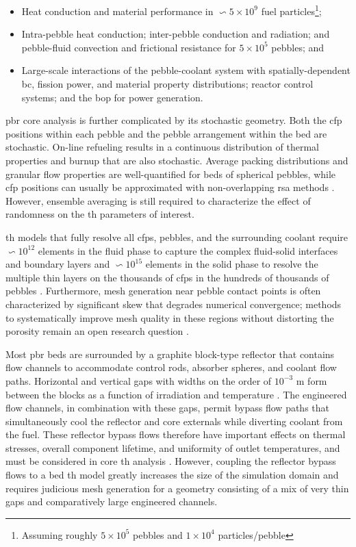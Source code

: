 \begin{itemize}
\item Heat conduction and material performance in \(\backsim5\times10^9\) fuel particles\hspace{0.01cm}\footnote{Assuming roughly \(5\times10^5\) pebbles and \(1\times10^4\) particles/pebble}; 
\item Intra-pebble heat conduction; inter-pebble conduction and radiation; and pebble-fluid convection and frictional resistance for \(5\times10^5\) pebbles; and
\item Large-scale interactions of the pebble-coolant system with spatially-dependent \gls{bc}, fission power, and material property distributions; reactor control systems; and the \gls{bop} for power generation.
\end{itemize}

\gls{pbr} core analysis is further complicated by its stochastic geometry. Both the \gls{cfp} positions within each pebble and the pebble arrangement within the bed are stochastic. On-line refueling results in a continuous distribution of thermal properties and burnup that are also stochastic. Average packing distributions and granular flow properties are well-quantified for beds of spherical pebbles, while \gls{cfp} positions can usually be approximated with non-overlapping \gls{rsa} methods \cite{jodrey}. However, ensemble averaging is still required to characterize the effect of randomness on the \gls{th} parameters of interest.

\gls{th} models that fully resolve all \glspl{cfp}, pebbles, and the surrounding coolant require \(\backsim10^{12}\) elements in the fluid phase to capture the complex fluid-solid interfaces and boundary layers \cite{wu2010} and \(\backsim10^{15}\) elements in the solid phase to resolve the multiple thin layers on the thousands of \glspl{cfp} in the hundreds of thousands of pebbles \cite{novak_2019}. Furthermore, mesh generation near pebble contact points is often characterized by significant skew that degrades numerical convergence; methods to systematically improve mesh quality in these regions without distorting the porosity remain an open research question \cite{dixon,nijemeisland}.

Most \gls{pbr} beds are surrounded by a graphite block-type reflector that contains flow channels to accommodate control rods, absorber spheres, and coolant flow paths. Horizontal and vertical gaps with widths on the order of \(10^{-3}\) \si{\meter} form between the blocks as a function of irradiation and temperature \cite{guo_2018,liu_sas}. The engineered flow channels, in combination with these gaps, permit bypass flow paths that simultaneously cool the reflector and core externals while diverting coolant from the fuel. These reflector bypass flows therefore have important effects on thermal stresses, overall component lifetime, and uniformity of outlet temperatures, and must be considered in core \gls{th} analysis \cite{guo_2018,anderson}. However, coupling the reflector bypass flows to a bed \gls{th} model greatly increases the size of the simulation domain and requires judicious mesh generation for a geometry consisting of a mix of very thin gaps and comparatively large engineered channels.

